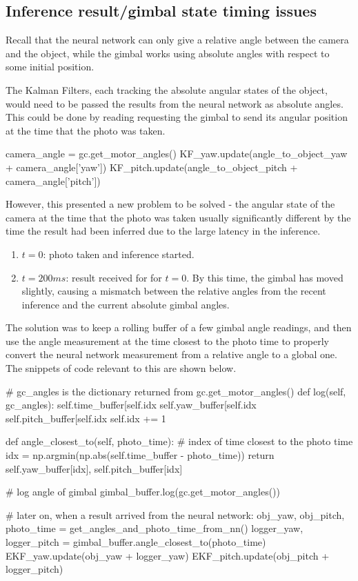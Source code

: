 \subsection{Inference result/gimbal state timing issues}
Recall that the neural network can only give a relative angle between the camera and the object, while the gimbal works using absolute angles with respect to some initial position.

The Kalman Filters, each tracking the absolute angular states of the object, would need to be passed the results from the neural network as absolute angles. This could be done by reading requesting the gimbal to send its angular position at the time that the photo was taken. \\

\begin{python}
camera_angle = gc.get_motor_angles()
KF_yaw.update(angle_to_object_yaw + camera_angle['yaw'])
KF_pitch.update(angle_to_object_pitch + camera_angle['pitch'])
\end{python}

However, this presented a new problem to be solved - the angular state of the camera at the time that the photo was taken usually significantly different by the time the result had been inferred due to the large latency in the inference.

\begin{enumerate}
\item $t = 0$: photo taken and inference started.
\item $t = 200ms$: result received for for $t=0$. By this time, the gimbal has moved slightly, causing a mismatch between the relative angles from the recent inference and the current absolute gimbal angles.
\end{enumerate}

The solution was to keep a rolling buffer of a few gimbal angle readings, and then use the angle measurement at the time closest to the photo time to properly convert the neural network measurement from a relative angle to a global one. The snippets of code relevant to this are shown below. \\

\begin{python}
# gc_angles is the dictionary returned from gc.get_motor_angles()
def log(self, gc_angles):
	self.time_buffer[self.idx %
	self.yaw_buffer[self.idx %
	self.pitch_buffer[self.idx %
	self.idx += 1

def angle_closest_to(self, photo_time):
    # index of time closest to the photo time
    idx = np.argmin(np.abs(self.time_buffer - photo_time))
    return self.yaw_buffer[idx], self.pitch_buffer[idx]

# log angle of gimbal
gimbal_buffer.log(gc.get_motor_angles())

# later on, when a result arrived from the neural network:
obj_yaw, obj_pitch, photo_time = get_angles_and_photo_time_from_nn()
logger_yaw, logger_pitch = gimbal_buffer.angle_closest_to(photo_time)
EKF_yaw.update(obj_yaw + logger_yaw)
EKF_pitch.update(obj_pitch + logger_pitch)
\end{python}

